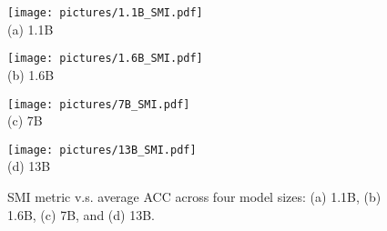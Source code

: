 \begin{figure*}[tb]
\vskip 0.2in
\begin{center}
    \begin{minipage}{0.24\textwidth}
        \centering
        \texttt{[image: pictures/1.1B\_SMI.pdf]} \\
        (a) 1.1B
    \end{minipage}
    \begin{minipage}{0.24\textwidth}
        \centering
        \texttt{[image: pictures/1.6B\_SMI.pdf]} \\
        (b) 1.6B
    \end{minipage}
    \begin{minipage}{0.24\textwidth}
        \centering
        \texttt{[image: pictures/7B\_SMI.pdf]} \\
        (c) 7B
    \end{minipage}
    \begin{minipage}{0.24\textwidth}
        \centering
        \texttt{[image: pictures/13B\_SMI.pdf]} \\
        (d) 13B
    \end{minipage}
    \caption{SMI metric v.s. average ACC across four model sizes: (a) 1.1B, (b) 1.6B, (c) 7B, and (d) 13B.}
\label{smi_figures}
\end{center}
\vskip -0.1in
\end{figure*}



